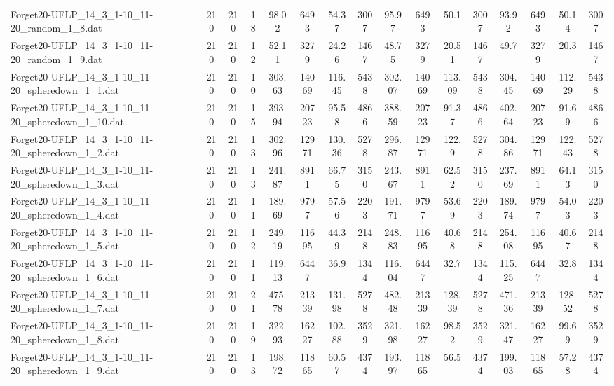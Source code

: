 \begin{sidewaystable}[!ht]
{\begin{tabular}{lccccccccccccccc}
Forget20-UFLP\_14\_3\_1-10\_11-20\_random\_1\_8.dat & 210 & 210 & 18 & 98.02 & 6493 & 54.37 & 3007 & 95.97 & 6493 &  \textcolor{blue2}{50.1} & 3007 & 93.92 & 6493 & 50.14 & 3007 \\
Forget20-UFLP\_14\_3\_1-10\_11-20\_random\_1\_9.dat & 210 & 210 & 12 & 52.11 & 3279 & 24.26 & 1467 & 48.75 & 3279 & 20.51 & 1467 & 49.7 & 3279 &  \textcolor{blue2}{20.3} & 1467 \\
Forget20-UFLP\_14\_3\_1-10\_11-20\_spheredown\_1\_1.dat & 210 & 210 & 10 & 303.63 & 14069 & 116.45 & 5438 & 302.07 & 14069 & 113.09 & 5438 & 304.45 & 14069 &  \textcolor{blue2}{112.29} & 5438 \\
Forget20-UFLP\_14\_3\_1-10\_11-20\_spheredown\_1\_10.dat & 210 & 210 & 15 & 393.94 & 20723 & 95.58 & 4866 & 388.59 & 20723 & 91.37 & 4866 & 402.64 & 20723 & 91.69 & 4866 \\
Forget20-UFLP\_14\_3\_1-10\_11-20\_spheredown\_1\_2.dat & 210 & 210 & 13 & 302.96 & 12971 & 130.36 & 5278 & 296.87 & 12971 & 122.9 & 5278 & 304.86 & 12971 &  \textcolor{blue2}{122.43} & 5278 \\
Forget20-UFLP\_14\_3\_1-10\_11-20\_spheredown\_1\_3.dat & 210 & 210 & 13 & 241.87 & 8911 & 66.75 & 3150 & 243.67 & 8911 &  \textcolor{blue2}{62.52} & 3150 & 237.69 & 8911 & 64.13 & 3150 \\
Forget20-UFLP\_14\_3\_1-10\_11-20\_spheredown\_1\_4.dat & 210 & 210 & 11 & 189.69 & 9797 & 57.56 & 2203 & 191.71 & 9797 &  \textcolor{blue2}{53.69} & 2203 & 189.74 & 9797 & 54.03 & 2203 \\
Forget20-UFLP\_14\_3\_1-10\_11-20\_spheredown\_1\_5.dat & 210 & 210 & 12 & 249.19 & 11695 & 44.39 & 2148 & 248.83 & 11695 & 40.68 & 2148 & 254.08 & 11695 &  \textcolor{blue2}{40.67} & 2148 \\
Forget20-UFLP\_14\_3\_1-10\_11-20\_spheredown\_1\_6.dat & 210 & 210 & 11 & 119.13 & 6447 & 36.9 & 1344 & 116.04 & 6447 &  \textcolor{blue2}{32.7} & 1344 & 115.25 & 6447 & 32.8 & 1344 \\
Forget20-UFLP\_14\_3\_1-10\_11-20\_spheredown\_1\_7.dat & 210 & 210 & 21 & 475.78 & 21339 & 131.98 & 5278 & 482.48 & 21339 & 128.39 & 5278 & 471.36 & 21339 & 128.52 & 5278 \\
Forget20-UFLP\_14\_3\_1-10\_11-20\_spheredown\_1\_8.dat & 210 & 210 & 19 & 322.93 & 16227 & 102.88 & 3529 & 321.98 & 16227 &  \textcolor{blue2}{98.52} & 3529 & 321.47 & 16227 & 99.69 & 3529 \\
Forget20-UFLP\_14\_3\_1-10\_11-20\_spheredown\_1\_9.dat & 210 & 210 & 13 & 198.72 & 11865 & 60.57 & 4374 & 193.97 & 11865 &  \textcolor{blue2}{56.5} & 4374 & 199.03 & 11865 & 57.28 & 4374 \\

\end{tabular}}
\end{sidewaystable}
